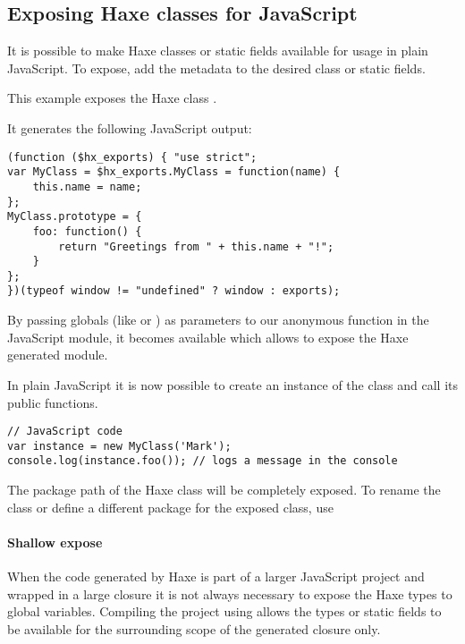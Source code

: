 \subsection{Exposing Haxe classes for JavaScript}
\label{target-javascript-expose}

It is possible to make Haxe classes or static fields available for usage in plain JavaScript. 
To expose, add the  metadata to the desired class or static fields.

This example exposes the Haxe class .


It generates the following JavaScript output:

\begin{lstlisting}
(function ($hx_exports) { "use strict";
var MyClass = $hx_exports.MyClass = function(name) {
	this.name = name;
};
MyClass.prototype = {
	foo: function() {
		return "Greetings from " + this.name + "!";
	}
};
})(typeof window != "undefined" ? window : exports);
\end{lstlisting}

By passing globals (like  or ) as parameters to our anonymous function in the JavaScript module, it becomes available which allows to expose the Haxe generated module.

In plain JavaScript it is now possible to create an instance of the class and call its public functions.

\begin{lstlisting}
// JavaScript code
var instance = new MyClass('Mark');
console.log(instance.foo()); // logs a message in the console
\end{lstlisting}

The package path of the Haxe class will be completely exposed. To rename the class or define a different package for the exposed class, use 

\paragraph{Shallow expose}

When the code generated by Haxe is part of a larger JavaScript project and wrapped in a large closure it is not always necessary to expose the Haxe types to global variables.
Compiling the project using  allows the types or static fields to be available for the surrounding scope of the generated closure only.


